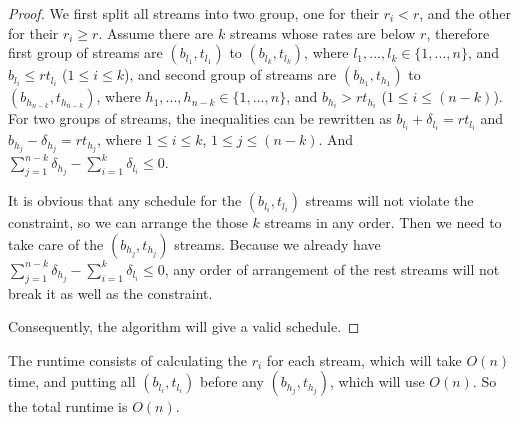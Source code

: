 \documentclass[letter,12pt]{article}
\begin{document}
\begin{proof}
We first split all streams into two group, one for their $r_i < r$, and the
other for their $r_i \geq r$. Assume there are $k$ streams whose rates
are below $r$, therefore first group of streams are $(b_{l_1}, t_{l_1})$ to
$(b_{l_k}, t_{l_k})$, where $l_1, ..., l_k \in \{1, ..., n\}$, and $b_{l_i} \le 
rt_{l_i}$ ($1 \le i \le k$), and second group of streams are $(b_{h_1}, 
t_{h_1})$ to $(b_{h_{n-k}}, t_{h_{n-k}})$, where $h_1, ..., h_{n-k} \in 
\{1, ..., n\}$, and $b_{h_i} > rt_{h_i}$ ($1 \le i \le (n-k)$). For two groups
of streams, the inequalities can be rewritten as $b_{l_i} + \delta_{l_i} 
= rt_{l_i}$ and $b_{h_j} - \delta_{h_j} = rt_{h_j}$, where $1 \le i \le k$,
$1 \le j \le (n-k)$. And $\sum\limits_{j=1}^{n-k} \delta_{h_j} - \sum\limits_{i=1}^k \delta_{l_i} \le 0$.

It is obvious that any schedule for the $(b_{l_i}, t_{l_i})$ streams will not
violate the constraint, so we can arrange the those $k$ streams in any
order. Then we need to take care of the $(b_{h_j}, t_{h_j})$ streams.
Because we already have $\sum\limits_{j=1}^{n-k} \delta_{h_j} - \sum\limits_{i=1}^k \delta_{l_i} \le 0$, any order of arrangement of 
the rest streams will not break it as well as the constraint.

Consequently, the algorithm will give a valid schedule.
\end{proof}

The runtime consists of calculating the $r_i$ for each stream, which
will take $O(n)$ time, and putting all $(b_{l_i}, t_{l_i})$ before any
$(b_{h_j}, t_{h_j})$, which will use $O(n)$. So the total runtime is $O(n)$.
\end{document}
